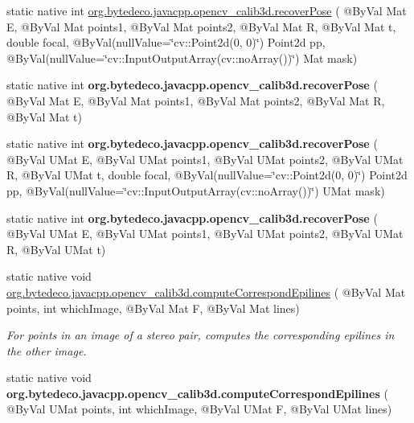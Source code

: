 \begin{DoxyCompactItemize}
\item 
static native int \hyperlink{group__calib3d_gaf6412b75e2ce96f4461d17a09c09c8b9}{org.\+bytedeco.\+javacpp.\+opencv\+\_\+calib3d.\+recover\+Pose} ( @By\+Val Mat E, @By\+Val Mat points1, @By\+Val Mat points2, @By\+Val Mat R, @By\+Val Mat t, double focal, @By\+Val(null\+Value=\char`\"{}cv\+::\+Point2d(0, 0)\char`\"{}) Point2d pp, @By\+Val(null\+Value=\char`\"{}cv\+::\+Input\+Output\+Array(cv\+::no\+Array())\char`\"{}) Mat mask)
\item 
\mbox{\label{group__calib3d_ga169e641416a67b5f6017be9234bfc93b}} 
static native int {\bfseries org.\+bytedeco.\+javacpp.\+opencv\+\_\+calib3d.\+recover\+Pose} ( @By\+Val Mat E, @By\+Val Mat points1, @By\+Val Mat points2, @By\+Val Mat R, @By\+Val Mat t)
\item 
\mbox{\label{group__calib3d_gac4b6e24a58518ff37797c103d7d21fae}} 
static native int {\bfseries org.\+bytedeco.\+javacpp.\+opencv\+\_\+calib3d.\+recover\+Pose} ( @By\+Val U\+Mat E, @By\+Val U\+Mat points1, @By\+Val U\+Mat points2, @By\+Val U\+Mat R, @By\+Val U\+Mat t, double focal, @By\+Val(null\+Value=\char`\"{}cv\+::\+Point2d(0, 0)\char`\"{}) Point2d pp, @By\+Val(null\+Value=\char`\"{}cv\+::\+Input\+Output\+Array(cv\+::no\+Array())\char`\"{}) U\+Mat mask)
\item 
\mbox{\label{group__calib3d_ga4a7d566ed56aff64092dc14997ccb10d}} 
static native int {\bfseries org.\+bytedeco.\+javacpp.\+opencv\+\_\+calib3d.\+recover\+Pose} ( @By\+Val U\+Mat E, @By\+Val U\+Mat points1, @By\+Val U\+Mat points2, @By\+Val U\+Mat R, @By\+Val U\+Mat t)
\item 
static native void \hyperlink{group__calib3d_ga7bf6bd2c5ee1b9d403fb85aa5dec095f}{org.\+bytedeco.\+javacpp.\+opencv\+\_\+calib3d.\+compute\+Correspond\+Epilines} ( @By\+Val Mat points, int which\+Image, @By\+Val Mat F, @By\+Val Mat lines)
\begin{DoxyCompactList}\small\item\em For points in an image of a stereo pair, computes the corresponding epilines in the other image. \end{DoxyCompactList}\item 
\mbox{\label{group__calib3d_ga30be6c0a68f6de4e4afb9c51f750b587}} 
static native void {\bfseries org.\+bytedeco.\+javacpp.\+opencv\+\_\+calib3d.\+compute\+Correspond\+Epilines} ( @By\+Val U\+Mat points, int which\+Image, @By\+Val U\+Mat F, @By\+Val U\+Mat lines)

\end{DoxyCompactItemize}
